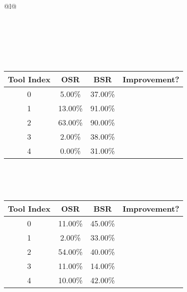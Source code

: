 \begin{longtable}{@{}l@{}}
\caption{Tool selection results for llama on ollama. \\ \textbf{Overall Improvement: 88.00\%}} \\
\toprule
{} \\
\midrule
\endfirsthead
\toprule
{} \\
\midrule
\endhead
\bottomrule
\endfoot
\begin{minipage}{\textwidth}
\centering{}\\[0.8ex]
\begin{tabular}{|c|c|c|c|} \hline
\textbf{Tool Index} & \textbf{OSR} & \textbf{ BSR} & \textbf{Improvement?} \\ \hline
0 & 5.00\% & 37.00\% & \textcolor{green}{\ding{51}} \\ \hline
1 & 13.00\% & 91.00\% & \textcolor{green}{\ding{51}} \\ \hline
2 & 63.00\% & 90.00\% & \textcolor{green}{\ding{51}} \\ \hline
3 & 2.00\% & 38.00\% & \textcolor{green}{\ding{51}} \\ \hline
4 & 0.00\% & 31.00\% & \textcolor{green}{\ding{51}} \\ \hline
\end{tabular}
\end{minipage}\\[2ex]
\begin{minipage}{\textwidth}
\centering\vspace{2ex}
\\[0.8ex]
\begin{tabular}{|c|c|c|c|} \hline
\textbf{Tool Index} & \textbf{OSR} & \textbf{ BSR} & \textbf{Improvement?} \\ \hline
0 & 11.00\% & 45.00\% & \textcolor{green}{\ding{51}} \\ \hline
1 & 2.00\% & 33.00\% & \textcolor{green}{\ding{51}} \\ \hline
2 & 54.00\% & 40.00\% & \textcolor{red}{\ding{55}} \\ \hline
3 & 11.00\% & 14.00\% & \textcolor{green}{\ding{51}} \\ \hline
4 & 10.00\% & 42.00\% & \textcolor{green}{\ding{51}} \\ \hline
\end{tabular}

\end{minipage}
\end{longtable}
